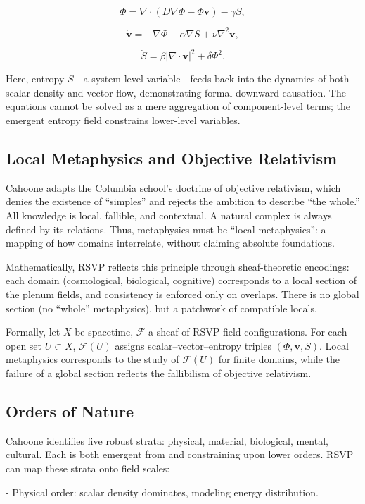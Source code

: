\documentclass[12pt]{book}
\begin{document}
\[ \dot{\Phi} = \nabla \cdot (D \nabla \Phi - \Phi \mathbf{v}) - \gamma S, \tag{2.1} \]

\[ \dot{\mathbf{v}} = -\nabla \Phi - \alpha \nabla S + \nu \nabla^2 \mathbf{v}, \tag{2.2} \]

\[ \dot{S} = \beta |\nabla \cdot \mathbf{v}|^2 + \delta \Phi^2. \tag{2.3} \]

Here, entropy \( S \)—a system-level variable—feeds back into the dynamics of both scalar density and vector flow, demonstrating formal downward causation. The equations cannot be solved as a mere aggregation of component-level terms; the emergent entropy field constrains lower-level variables.

\subsection{Local Metaphysics and Objective Relativism}
Cahoone adapts the Columbia school’s doctrine of objective relativism, which denies the existence of “simples” and rejects the ambition to describe “the whole.” All knowledge is local, fallible, and contextual. A natural complex is always defined by its relations. Thus, metaphysics must be “local metaphysics”: a mapping of how domains interrelate, without claiming absolute foundations.

Mathematically, RSVP reflects this principle through sheaf-theoretic encodings: each domain (cosmological, biological, cognitive) corresponds to a local section of the plenum fields, and consistency is enforced only on overlaps. There is no global section (no “whole” metaphysics), but a patchwork of compatible locals.

Formally, let \( X \) be spacetime, \( \mathcal{F} \) a sheaf of RSVP field configurations. For each open set \( U \subset X \), \( \mathcal{F}(U) \) assigns scalar–vector–entropy triples \( (\Phi, \mathbf{v}, S) \). Local metaphysics corresponds to the study of \( \mathcal{F}(U) \) for finite domains, while the failure of a global section reflects the fallibilism of objective relativism.

\subsection{Orders of Nature}
Cahoone identifies five robust strata: physical, material, biological, mental, cultural. Each is both emergent from and constraining upon lower orders. RSVP can map these strata onto field scales:

- Physical order: scalar density dominates, modeling energy distribution.
\end{document}
